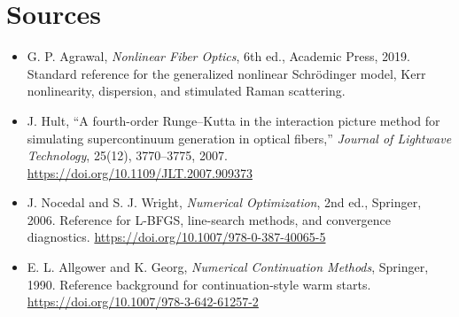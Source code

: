 \documentclass[11pt]{article}
\begin{document}
\section{Sources}

\begin{itemize}
\item G. P. Agrawal, \emph{Nonlinear Fiber Optics}, 6th ed., Academic Press,
2019.  Standard reference for the generalized nonlinear Schr\"odinger model,
Kerr nonlinearity, dispersion, and stimulated Raman scattering.
\item J. Hult, ``A fourth-order Runge--Kutta in the interaction picture method
for simulating supercontinuum generation in optical fibers,'' \emph{Journal of
Lightwave Technology}, 25(12), 3770--3775, 2007.
\url{https://doi.org/10.1109/JLT.2007.909373}
\item J. Nocedal and S. J. Wright, \emph{Numerical Optimization}, 2nd ed.,
Springer, 2006.  Reference for L-BFGS, line-search methods, and convergence
diagnostics. \url{https://doi.org/10.1007/978-0-387-40065-5}
\item E. L. Allgower and K. Georg, \emph{Numerical Continuation Methods},
Springer, 1990.  Reference background for continuation-style warm starts.
\url{https://doi.org/10.1007/978-3-642-61257-2}
\end{itemize}
\end{document}
